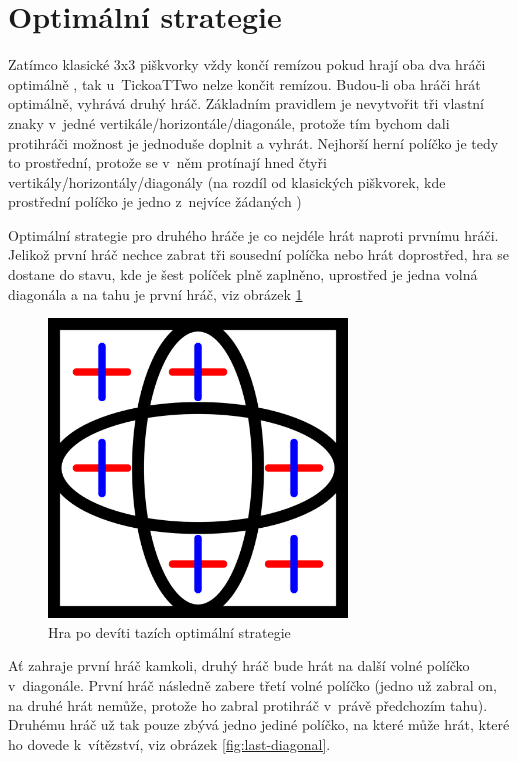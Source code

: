 
\section{Optimální strategie}
Zatímco klasické 3x3 piškvorky vždy končí remízou pokud hrají oba dva hráči optimálně
\cite{crowley1993}, tak u~TickoaTTwo nelze končit remízou. Budou-li oba hráči hrát
optimálně, vyhrává druhý hráč. Základním pravidlem je nevytvořit tři vlastní
znaky v~jedné vertikále/horizontále/diagonále, protože tím bychom dali
protihráči možnost je jednoduše doplnit a vyhrát. Nejhorší herní políčko je
tedy to prostřední, protože se v~něm protínají hned čtyři
vertikály/horizontály/diagonály (na rozdíl od klasických piškvorek, kde
prostřední políčko je jedno z~nejvíce žádaných \cite{xkcd832})

Optimální strategie pro druhého hráče je co nejdéle hrát naproti prvnímu hráči.
Jelikož první hráč nechce zabrat tři sousední políčka nebo hrát doprostřed, hra
se dostane do stavu, kde je šest políček plně zaplněno, uprostřed je jedna
volná diagonála a na tahu je první hráč, viz obrázek \ref{fig:empty-diagonal}

\begin{figure}[h]
    \centering
    \includegraphics[width=300px]{img/empty-diagonal.png}
    \caption{Hra po devíti tazích optimální strategie}
    \label{fig:empty-diagonal}
\end{figure}

Ať zahraje první hráč kamkoli, druhý hráč bude hrát na další volné políčko
v~diagonále. První hráč následně zabere třetí volné políčko (jedno už zabral on,
na druhé hrát nemůže, protože ho zabral protihráč v~právě předchozím tahu).
Druhému hráč už tak pouze zbývá jedno jediné políčko, na které může hrát, které
ho dovede k~vítězství, viz obrázek \ref{fig:last-diagonal}.


